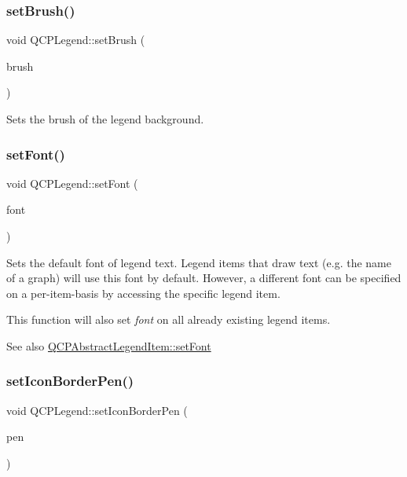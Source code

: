 \subsubsection{\texorpdfstring{set\+Brush()}{setBrush()}}
{\footnotesize\ttfamily void Q\+C\+P\+Legend\+::set\+Brush (\begin{DoxyParamCaption}\item[{const Q\+Brush \&}]{brush }\end{DoxyParamCaption})}

Sets the brush of the legend background. \hypertarget{class_q_c_p_legend_aa4cda8499e3cb0f3be415edc02984c73}{}\label{class_q_c_p_legend_aa4cda8499e3cb0f3be415edc02984c73} 
\subsubsection{\texorpdfstring{set\+Font()}{setFont()}}
{\footnotesize\ttfamily void Q\+C\+P\+Legend\+::set\+Font (\begin{DoxyParamCaption}\item[{const Q\+Font \&}]{font }\end{DoxyParamCaption})}

Sets the default font of legend text. Legend items that draw text (e.\+g. the name of a graph) will use this font by default. However, a different font can be specified on a per-\/item-\/basis by accessing the specific legend item.

This function will also set {\itshape font} on all already existing legend items.

\begin{DoxySeeAlso}{See also}
\hyperlink{class_q_c_p_abstract_legend_item_a409c53455d8112f71d70c0c43eb10265}{Q\+C\+P\+Abstract\+Legend\+Item\+::set\+Font} 
\end{DoxySeeAlso}
\hypertarget{class_q_c_p_legend_a2f2c93d18a651f4ff294bb3f026f49b8}{}\label{class_q_c_p_legend_a2f2c93d18a651f4ff294bb3f026f49b8} 
\subsubsection{\texorpdfstring{set\+Icon\+Border\+Pen()}{setIconBorderPen()}}
{\footnotesize\ttfamily void Q\+C\+P\+Legend\+::set\+Icon\+Border\+Pen (\begin{DoxyParamCaption}\item[{const Q\+Pen \&}]{pen }\end{DoxyParamCaption})}

